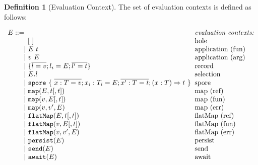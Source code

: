 \documentclass{article}
\theoremstyle{definition}
\newtheorem{defn}{Definition}[section]
\newcommand{\gap}{\quad\quad}
\newcommand{\ba}{\begin{array}}
\newcommand{\ea}{\end{array}}
\newcommand{\seq}[1]{\overline{#1}}
\begin{document}
\begin{defn}[Evaluation Context]
  The set of evaluation contexts is defined as follows:
  
 $\ba[t]{l@{\hspace{2mm}}l}
E ::=                                                                                                     & \mbox{\it{evaluation contexts:}} \\
\gap \:\:\:\: [~]                                                                                         & \mbox{hole} \\
\gap ~|~  E~t                                                                                             & \mbox{application (fun)} \\
\gap ~|~  v~E                                                                                             & \mbox{application (arg)} \\
\gap ~|~  \{ \seq{l = v} ; l_i = E ; \seq{l' = t} \}                                                      & \mbox{record} \\
\gap ~|~  E.l                                                                                             & \mbox{selection} \\
\gap ~|~  \texttt{spore}~\{~\seq{x : T = v} ; x_i : T_i = E ; \seq{x' : T = t} ; (x: T) \Rightarrow t~\}  & \mbox{spore} \\
\gap ~|~  \texttt{map}(E, t[, t])                                                                         & \mbox{map (ref)} \\
\gap ~|~  \texttt{map}(v, E[, t])                                                                         & \mbox{map (fun)} \\
\gap ~|~  \texttt{map}(v, v', E)                                                                          & \mbox{map (err)} \\
\gap ~|~  \texttt{flatMap}(E, t[, t])                                                                     & \mbox{flatMap (ref)} \\
\gap ~|~  \texttt{flatMap}(v, E[, t])                                                                     & \mbox{flatMap (fun)} \\
\gap ~|~  \texttt{flatMap}(v, v', E)                                                                      & \mbox{flatMap (err)} \\
\gap ~|~  \texttt{persist}(E)                                                                             & \mbox{persist} \\
\gap ~|~  \texttt{send}(E)                                                                                & \mbox{send} \\
\gap ~|~  \texttt{await}(E)                                                                               & \mbox{await} \\
\ea$ 
\end{defn}
\end{document}
